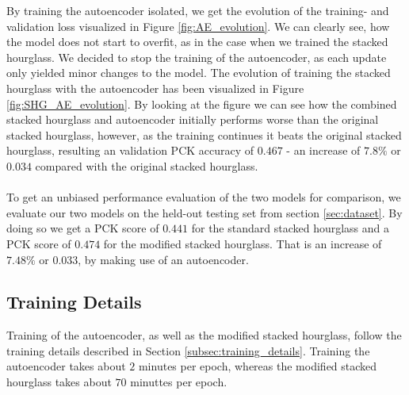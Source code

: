 \documentclass[./main.tex]{subfiles}
\begin{document}
\noindent By training the autoencoder isolated, we get the evolution of the training- and validation loss visualized in Figure \ref{fig:AE_evolution}. We can clearly see, how the model does not start to overfit, as in the case when we trained the stacked hourglass. We decided to stop the training of the autoencoder, as each update only yielded minor changes to the model. The evolution of training the stacked hourglass with the autoencoder has been visualized in Figure \ref{fig:SHG_AE_evolution}. By looking at the figure we can see how the combined stacked hourglass and autoencoder initially performs worse than the original stacked hourglass, however, as the training continues it beats the original stacked hourglass, resulting an validation PCK accuracy of $0.467$ - an increase of $7.8\%$ or $0.034$ compared with the original stacked hourglass.
\\
\\
To get an unbiased performance evaluation of the two models for comparison, we evaluate our two models on the held-out testing set from section \ref{sec:dataset}. By doing so we get a PCK score of $0.441$ for the standard stacked hourglass and a PCK score of $0.474$ for the modified stacked hourglass. That is an increase of $7.48\%$ or $0.033$, by making use of an autoencoder.

\subsection{Training Details}\label{subsec:improv_train}
Training of the autoencoder, as well as the modified stacked hourglass, follow the training details described in Section \ref{subsec:training_details}. Training the autoencoder takes about $2$ minutes per epoch, whereas the modified stacked hourglass takes about $70$ minuttes per epoch.
\end{document}
